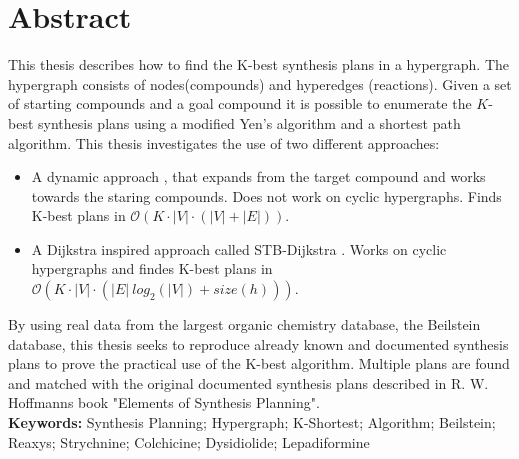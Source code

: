 \documentclass[a4paper,10pt,titlepage]{paper}
\begin{document}
\begin{titlepage}
\end{titlepage}

\vfill
\section*{Abstract}
This thesis describes how to find the K-best synthesis plans in a hypergraph. The hypergraph consists of nodes(compounds) and hyperedges (reactions). Given a set of starting compounds and a goal compound it is possible to enumerate the $K$-best synthesis plans using a modified Yen's algorithm and a shortest path algorithm. This thesis investigates the use of two different approaches: 
\begin{itemize}
\item
A dynamic approach \cite{Carsten}, that expands from the target compound and works towards the staring compounds. Does not work on cyclic hypergraphs. Finds K-best plans in $\mathcal{O}(K \cdot |V| \cdot (|V|+|E|))$.
\item
A Dijkstra inspired approach called STB-Dijkstra \cite{Nielsen}. Works on cyclic hypergraphs and findes K-best plans in $\mathcal{O}(K \cdot |V| \cdot (|E|\ log_2 (|V|) + size(h)))$.\\
\end{itemize}
By using real data from the largest organic chemistry database, the Beilstein database, this thesis seeks to reproduce already known and documented synthesis plans to prove the practical use of the K-best algorithm. Multiple plans are found and matched with the original documented synthesis plans described in R. W. Hoffmanns book "Elements of Synthesis Planning". \\

\textbf{Keywords:} Synthesis Planning; Hypergraph; K-Shortest; Algorithm; Beilstein; Reaxys; Strychnine; Colchicine; Dysidiolide; Lepadiformine
\newpage

\tableofcontents
\newpage
\end{document}
